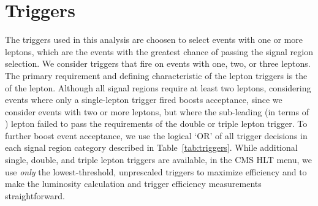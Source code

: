 \section{Triggers}
The triggers used in this analysis are choosen to select events with one or more leptons, which are the events with the greatest
chance of passing the signal region selection. We consider triggers that fire on events with one, two, or three leptons. The primary
requirement and defining characteristic of the lepton triggers is the \pt of the lepton.
Although all signal regions require at least two leptons, considering events where only a single-lepton trigger fired boosts acceptance, since
we consider events with two or more leptons, but where the sub-leading (in terms of \pt) lepton failed to pass the requirements of the
double or triple lepton trigger. To further boost event acceptance, we use the logical `OR' of all trigger decisions in each signal
region category described in Table~\ref{tab:triggers}. While additional single, double, and triple lepton triggers are available,
in the CMS HLT menu, we use \emph{only} the lowest-threshold, unprescaled triggers to maximize efficiency and to make the luminosity
calculation and trigger efficiency measurements straightforward. 

